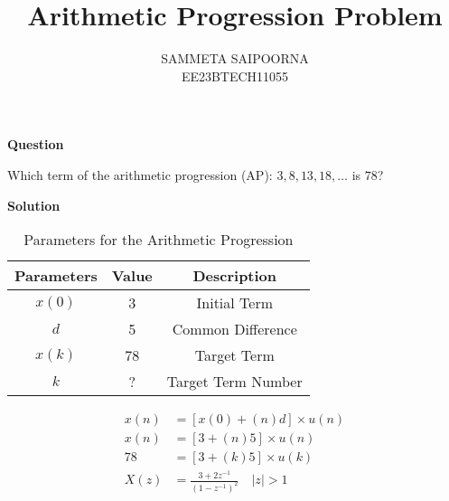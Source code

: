 \documentclass[12pt]{article}
\title{Arithmetic Progression Problem}
\author{SAMMETA SAIPOORNA \\
        EE23BTECH11055}
\date{}
\newcommand{\initialterm}{3}
\newcommand{\commondifference}{5}
\begin{document}
\maketitle

\textbf{Question}

Which term of the arithmetic progression (AP): \(3, 8, 13, 18, \ldots\) is \(78\)?

\textbf{Solution}
\begin{table}[h!]
\centering

\begin{tabular}{|c|c|c|}
  \hline
  Parameters & Value & Description \\
  \hline
  \(x(0)\) & 3 & Initial Term \\
  \hline
  \(d\) & 5 & Common Difference \\
  \hline
  \(x(k)\) & 78 & Target Term \\
  \hline
  \(k\) & ? & Target Term Number\\
  \hline
\end{tabular}
\caption{Parameters for the Arithmetic Progression}
\label{tab:ap-parameters}
\end{table}
\begin{align}
x(n) &= [x(0) + (n)d] \times u(n) \\
x(n) &= [\initialterm + (n)\commondifference] \times u(n) \\
78 &= [\initialterm + (k)\commondifference] \times u(k) \\
X(z) &= \frac{3 + 2z^{-1}}{(1 - z^{-1})^2} \quad |z| > 1
\end{align}
\end{document}
